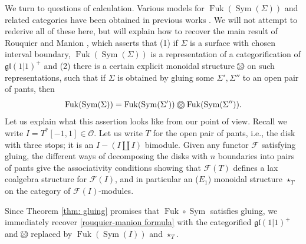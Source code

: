 \documentclass{article}
\DeclareMathOperator{\Sym}{Sym}
\DeclareMathOperator{\Fuk}{Fuk}
\newcommand{\ootimes}{
\ooalign{$\otimes$\cr\hidewidth$\bigcirc$\hidewidth}}
\theoremstyle{definition}
\begin{document}
We turn to questions of calculation.  Various models for $\Fuk(\Sym(\Sigma))$ and related categories have been obtained in previous works \cite{Lipschitz-Ozsvath-Thurston,  Auroux-bordered,
Douglas-Manolescu, Douglas-Lipschitz-Manolescu, rouquier-manion, Dyckerhoff-Jasso-Lekili, didedda}.  We will not attempt to rederive all of these here, but will explain how to recover the main result of Rouquier and Manion  \cite[Thm. 1.3.1]{rouquier-manion}, which asserts that (1) if $\Sigma$ is a surface with chosen interval boundary, $\Fuk(\Sym(\Sigma))$ is a representation of a categorification of $\mathfrak{gl}(1|1)^+$ and (2)
    there is a certain explicit monoidal structure $\ootimes$ on such representations, such that if $\Sigma$ is obtained by gluing some $\Sigma', \Sigma''$ to an open pair of pants, then 
    \begin{equation} \label{rouquier-manion formula}\Fuk(\Sym(\Sigma)) = \Fuk(\Sym(\Sigma')) \,\, \ootimes \,\Fuk(\Sym(\Sigma'')).\end{equation}
    Let us explain what this assertion looks like from our point of view. 
    Recall we write $I = T^*[-1,1] \in \mathscr{O}$.  
    Let us write $T$ for the open pair of pants, i.e., the  disk with three stops; it is an $I-(I \coprod I)$ bimodule. Given any functor $\mathcal{F}$ satisfying gluing, 
    the different ways of decomposing the disks with $n$ boundaries into pairs of pants give the associativity conditions showing that $\mathcal{F}(T)$ defines a lax coalgebra structure for $\mathcal{F}(I)$, and in particular an ($E_1$) monoidal structure $\star_T$ on the category of $\mathcal{F}(I)$-modules.     
    
    Since Theorem \ref{thm: gluing} promises that $\Fuk \circ \Sym$ satisfies gluing, we immediately recover  \eqref{rouquier-manion formula} with the categorified $\mathfrak{gl}(1|1)^+$ and $\ootimes$ replaced by 
    $\Fuk(\Sym(I))$ and $\star_T$.
    
\end{document}
